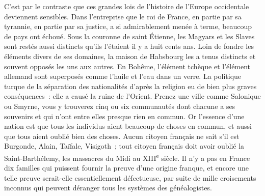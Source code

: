 \documentclass[french,twoside]{book} %
\newcommand\orgName[1]{#1}
\newcommand\persName[1]{#1}
\newcommand\placeName[1]{#1}
\begin{document}
C’est par le contraste que ces grandes lois de l’histoire de l’{\placeName Europe occidentale} deviennent sensibles. Dans l’entreprise que le {\persName roi de France}, en partie par sa tyrannie, en partie par sa justice, a si admirablement menée à terme, beaucoup de pays ont échoué. Sous la couronne de saint Étienne, les {\orgName Magyars} et les {\orgName Slaves} sont restés aussi distincts qu’ils l’étaient il y a huit cents ans. Loin de fondre les éléments divers de ses domaines, la {\orgName maison de Habsbourg} les a tenus distincts et souvent opposés les uns aux autres. En {\placeName Bohême}, l’élément tchèque et l’élément allemand sont superposés comme l’huile et l’eau dans un verre. La politique turque de la séparation des nationalités d’après la religion eu de bien plus graves conséquences : elle a causé la ruine de l’{\orgName Orient}. Prenez une ville comme {\placeName Salonique} ou {\placeName Smyrne}, vous y trouverez cinq ou six communautés dont chacune a ses souvenirs et qui n’ont entre elles presque rien en commun. Or l’essence d’une nation est que tous les individus aient beaucoup de choses en commun, et aussi que tous aient oublié bien des choses. Aucun citoyen français ne sait s’il est Burgonde, Alain, Taïfale, Visigoth ; tout citoyen français doit avoir oublié la Saint-Barthélemy, les massacres du {\placeName Midi} au XIII\textsuperscript{e} siècle. Il n’y a pas en {\placeName France} dix familles qui puissent fournir la preuve d’une origine franque, et encore une telle preuve serait-elle essentiellement défectueuse, par suite de mille croisements inconnus qui peuvent déranger tous les systèmes des généalogistes.\par
\end{document}
